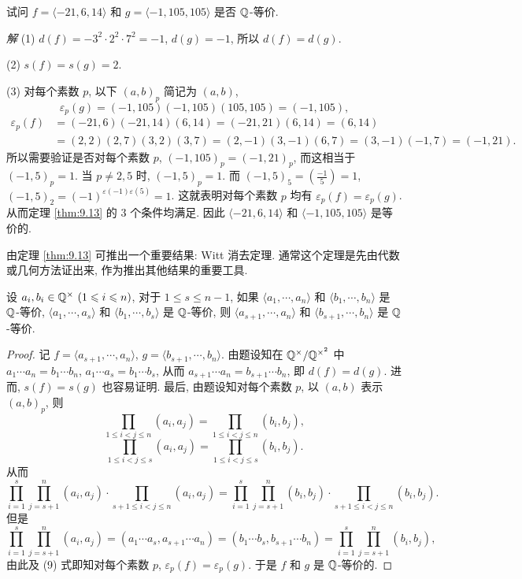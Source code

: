 \begin{example}
试问 $f=\langle -21,6,14\rangle$ 和 $g=\langle -1,105,105\rangle$ 是否 $\mathbb{Q}$-等价.

\emph{解} (1) $d(f)=-3^2\cdot 2^2\cdot 7^2=-1$, $d(g)=-1$, 所以 $d(f)=d(g)$.

(2) $s(f)=s(g)=2$.

(3) 对每个素数 $p$, 以下 $(a,b)_p$ 简记为 $(a,b)$,
\[
  \varepsilon_p(g)=(-1,105)(-1,105)(105,105)=(-1,105),
\]
\[
  \begin{aligned}
    \varepsilon_p(f)&=(-21,6)(-21,14)(6,14)
    =(-21,21)(6,14)=(6,14)\\
    &=(2,2)(2,7)(3,2)(3,7)
    =(2,-1)(3,-1)(6,7)=(3,-1)(-1,7)=(-1,21).
  \end{aligned}
\]
所以需要验证是否对每个素数 $p$, $(-1,105)_p=(-1,21)_p$, 而这相当于 $(-1,5)_p=1$. 当 $p\neq 2,5$ 时, $(-1,5)_p=1$. 而 $(-1,5)_5=\left(\frac{-1}{5}\right)=1$, $(-1,5)_2=(-1)^{\varepsilon(-1)\varepsilon(5)}=1$. 这就表明对每个素数 $p$ 均有 $\varepsilon_p(f)=\varepsilon_p(g)$. 从而定理 \ref{thm:9.13} 的 $3$ 个条件均满足. 因此 $\langle -21,6,14\rangle$ 和 $\langle -1,105,105\rangle$ 是等价的.
\end{example}

由定理 \ref{thm:9.13} 可推出一个重要结果: Witt 消去定理. 通常这个定理是先由代数或几何方法证出来, 作为推出其他结果的重要工具.

\begin{theorem}\label{thm:9.14}
设 $a_i,b_i\in\mathbb{Q}^{\times}\ (1\leqslant i\leqslant n)$, 对于 $1\leqslant s\leqslant n-1$, 如果 $\langle a_1,\cdots,a_n\rangle$ 和 $\langle b_1,\cdots,b_n\rangle$ 是 $\mathbb{Q}$-等价, $\langle a_1,\cdots,a_s\rangle$ 和 $\langle b_1,\cdots,b_s\rangle$ 是 $\mathbb{Q}$-等价, 则 $\langle a_{s+1},\cdots,a_n\rangle$ 和 $\langle b_{s+1},\cdots,b_n\rangle$ 是 $\mathbb{Q}$-等价.
\end{theorem}

\begin{proof}
记 $f=\langle a_{s+1},\cdots,a_n\rangle$, $g=\langle b_{s+1},\cdots,b_n\rangle$. 由题设知在 $\mathbb{Q}^{\times}/\mathbb{Q}^{\times^2}$ 中 $a_1\cdots a_n=b_1\cdots b_n$, $a_1\cdots a_s=b_1\cdots b_s$, 从而 $a_{s+1}\cdots a_n=b_{s+1}\cdots b_n$, 即 $d(f)=d(g)$. 进而, $s(f)=s(g)$ 也容易证明. 最后, 由题设知对每个素数 $p$, 以 $(a,b)$ 表示 $(a,b)_p$, 则
\[
  \prod_{1\leqslant i<j\leqslant n}(a_i,a_j)
  =\prod_{1\leqslant i<j\leqslant n}(b_i,b_j),
\]
\[
  \prod_{1\leqslant i<j\leqslant s}(a_i,a_j)
  =\prod_{1\leqslant i<j\leqslant s}(b_i,b_j).
\]
从而
\begin{equation}\tag{9}
  \prod_{i=1}^{s}\prod_{j=s+1}^{n}(a_i,a_j)\cdot
  \prod_{s+1\leqslant i<j\leqslant n}(a_i,a_j)
  =\prod_{i=1}^{s}\prod_{j=s+1}^{n}(b_i,b_j)\cdot
  \prod_{s+1\leqslant i<j\leqslant n}(b_i,b_j).
\end{equation}
但是
\[
  \prod_{i=1}^{s}\prod_{j=s+1}^{n}(a_i,a_j)
  =(a_1\cdots a_s,a_{s+1}\cdots a_n)
  =(b_1\cdots b_s,b_{s+1}\cdots b_n)
  =\prod_{i=1}^{s}\prod_{j=s+1}^{n}(b_i,b_j),
\]
由此及 (9) 式即知对每个素数 $p$, $\varepsilon_p(f)=\varepsilon_p(g)$. 于是 $f$ 和 $g$ 是 $\mathbb{Q}$-等价的.
\end{proof}

